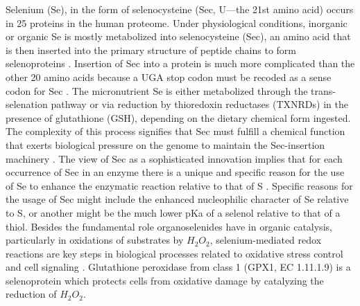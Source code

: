 Selenium (Se), in the form of selenocysteine (Sec, U—the 21st amino acid) occurs in 25 proteins in the human proteome. Under physiological conditions, inorganic or organic Se is mostly metabolized into selenocysteine (Sec), an amino acid that is then inserted into the primary structure of peptide chains to form selenoproteins \cite{}. Insertion of Sec into a protein is much more complicated than the other 20 amino acids because a UGA stop codon must be recoded as a sense codon for Sec \cite{hondal_differing_2011}. The micronutrient Se is either metabolized through the trans-selenation pathway or via reduction by thioredoxin reductases (TXNRDs) in the presence of glutathione (GSH), depending on the dietary chemical form ingested\cite{}.  The complexity of this process signifies that Sec must fulfill a chemical function that exerts biological pressure on the genome to maintain the Sec-insertion machinery \cite{hondal_differing_2011,cardey_selenocysteine_2007}. The view of Sec as a sophisticated innovation implies that for each occurrence of Sec in an enzyme there is a unique and specific reason for the use of Se to enhance the enzymatic reaction relative to that of S \cite{hondal_differing_2011}. Specific reasons for the usage of Sec might include the enhanced nucleophilic character of Se relative to S, or another might be the much lower pKa of a selenol relative to that of a thiol\cite{hondal_differing_2011}. Besides the fundamental role organoselenides have in organic catalysis, particularly in oxidations of substrates by $H_{2} O_{2}$, selenium-mediated redox reactions are key steps in biological processes related to oxidative stress control and cell signaling \cite{14}. Glutathione peroxidase from class 1 (GPX1, EC 1.11.1.9) is a selenoprotein which protects cells from oxidative damage by catalyzing the reduction of $H_{2} O_{2}$.

